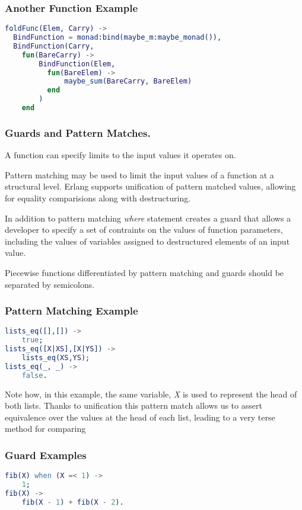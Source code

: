 \documentclass{beamer}
\begin{document}
\begin{frame}[fragile]
  \frametitle{Another Function Example}
\begin{lstlisting}[language=erlang]
foldFunc(Elem, Carry) ->
  BindFunction = monad:bind(maybe_m:maybe_monad()),
  BindFunction(Carry,
    fun(BareCarry) ->
        BindFunction(Elem,
          fun(BareElem) ->
              maybe_sum(BareCarry, BareElem)
          end
        )
    end
\end{lstlisting}
\end{frame}

\begin{frame}
  \frametitle{Guards and Pattern Matches.}
  A function can specify limits to the input values it operates on.

  Pattern matching may be used to limit the input values of a function
  at a structural level.  Erlang supports unification of pattern
  matched values, allowing for equality comparisions along with
  destructuring.

  In addition to pattern matching \emph{where} statement creates a
  guard that allows a developer to specify a set of contraints on the
  values of function parameters, including the values of variables
  assigned to destructured elements of an input value.

  Piecewise functions differentiated by pattern matching and guards
  should be separated by semicolons.
\end{frame}

\begin{frame}[fragile]
  \frametitle{Pattern Matching Example}
\begin{lstlisting}[language=erlang]
lists_eq([],[]) ->
    true;
lists_eq([X|XS],[X|YS]) ->
    lists_eq(XS,YS);
lists_eq(_, _) ->
    false.
\end{lstlisting}

  Note how, in this example, the same variable, \emph{X} is used to
  represent the head of both lists.  Thanks to unification this
  pattern match allows us to assert equivalence over the values at the
  head of each list, leading to a very terse method for comparing
\end{frame}

\begin{frame}[fragile]
  \frametitle{Guard Examples}
\begin{lstlisting}[language=erlang]
fib(X) when (X =< 1) ->
    1;
fib(X) ->
    fib(X - 1) + fib(X - 2).
\end{lstlisting}
\end{frame}
\end{document}
